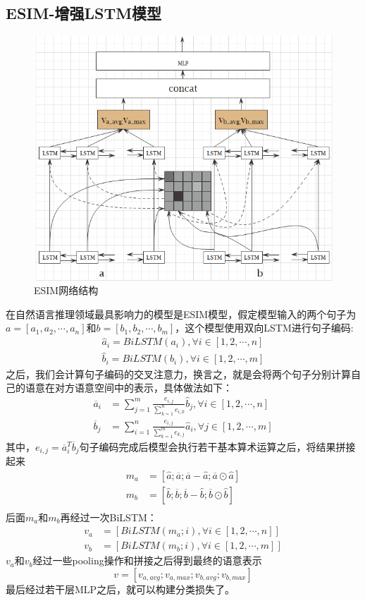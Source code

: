 \documentclass[twoside,a4paper,12pt]{book}%
\begin{document}
\subsection{ESIM-增强LSTM模型}
\begin{figure}[h]
\begin{center}
\includegraphics[width=5.6in]{figures/esim1.png}
\caption{ESIM网络结构}
\label{fig:esim1}
\end{center}
\end{figure}
在自然语言推理领域最具影响力的模型是ESIM模型，假定模型输入的两个句子为$a=[a_1,a_2,\cdots,a_n]$和$b=[b_1,b_2,\cdots,b_m]$，这个模型使用双向\gls{LSTM}进行句子编码:
$$
\begin{aligned}
\hat{a}_i = BiLSTM(a_i), \forall i \in [1,2,\cdots,n] \\
\hat{b}_i = BiLSTM(b_i), \forall i \in [1,2,\cdots,m]
\end{aligned}
$$
之后，我们会计算句子编码的交叉注意力，换言之，就是会将两个句子分别计算自己的语意在对方语意空间中的表示，具体做法如下：
$$
\begin{aligned}
\overline{a}_i &= \sum_{j=1}^m{
\frac{e_{i,j}}{\sum_{k=1}^n{e_{i,k}}}\hat b_j}, \forall i \in [1,2,\cdots,n] \\
\overline{b}_j &= \sum_{i=1}^n{\frac{e_{i,j}}{\sum_{k=1}^m{e_{k,j}}}\hat a_i}, \forall j \in [1,2,\cdots,m]
\end{aligned}
$$
其中，$e_{i,j}=\overline{a}_i^T\overline b_j$句子编码完成后模型会执行若干基本算术运算之后，将结果拼接起来
$$
\begin{aligned}
m_a&=[\hat a; \overline a; \overline a - \hat a; \overline a \odot \hat a]\\
m_b&=[\hat b; \overline b; \overline b - \hat b; \overline b \odot \hat b]\\
\end{aligned}
$$
后面$m_a$和$m_b$再经过一次BiLSTM：
$$
\begin{aligned}
v_a &= [BiLSTM(m_a;i), \forall i \in [1,2,\cdots,n]] \\
v_b &= [BiLSTM(m_b;i), \forall i \in [1,2,\cdots,m]]
\end{aligned}
$$
$v_a$和$v_b$经过一些pooling操作和拼接之后得到最终的语意表示
$$
v=[v_{a,avg};v_{a,max};v_{b,avg};v_{b,max}]
$$
最后经过若干层\gls{MLP}之后，就可以构建分类损失了。
\end{document}
